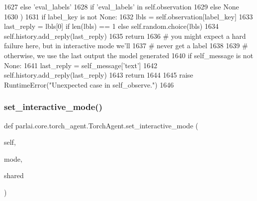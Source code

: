 \begin{DoxyCode}
1627                 \textcolor{keywordflow}{else} \textcolor{stringliteral}{'eval\_labels'}
1628                 \textcolor{keywordflow}{if} \textcolor{stringliteral}{'eval\_labels'} \textcolor{keywordflow}{in} self.observation
1629                 \textcolor{keywordflow}{else} \textcolor{keywordtype}{None}
1630             )
1631             \textcolor{keywordflow}{if} label\_key \textcolor{keywordflow}{is} \textcolor{keywordflow}{not} \textcolor{keywordtype}{None}:
1632                 lbls = self.observation[label\_key]
1633                 last\_reply = lbls[0] \textcolor{keywordflow}{if} len(lbls) == 1 \textcolor{keywordflow}{else} self.random.choice(lbls)
1634                 self.history.add\_reply(last\_reply)
1635                 \textcolor{keywordflow}{return}
1636             \textcolor{comment}{# you might expect a hard failure here, but in interactive mode we'll}
1637             \textcolor{comment}{# never get a label}
1638 
1639         \textcolor{comment}{# otherwise, we use the last output the model generated}
1640         \textcolor{keywordflow}{if} self\_message \textcolor{keywordflow}{is} \textcolor{keywordflow}{not} \textcolor{keywordtype}{None}:
1641             last\_reply = self\_message[\textcolor{stringliteral}{'text'}]
1642             self.history.add\_reply(last\_reply)
1643             \textcolor{keywordflow}{return}
1644 
1645         \textcolor{keywordflow}{raise} RuntimeError(\textcolor{stringliteral}{"Unexpected case in self\_observe."})
1646 
\end{DoxyCode}
\mbox{\label{classparlai_1_1core_1_1torch__agent_1_1TorchAgent_a6a7aff29231816a0f3cade9c72409dfc}} 
\subsubsection{\texorpdfstring{set\+\_\+interactive\+\_\+mode()}{set\_interactive\_mode()}}
{\footnotesize\ttfamily def parlai.\+core.\+torch\+\_\+agent.\+Torch\+Agent.\+set\+\_\+interactive\+\_\+mode (\begin{DoxyParamCaption}\item[{}]{self,  }\item[{}]{mode,  }\item[{}]{shared }\end{DoxyParamCaption})}

